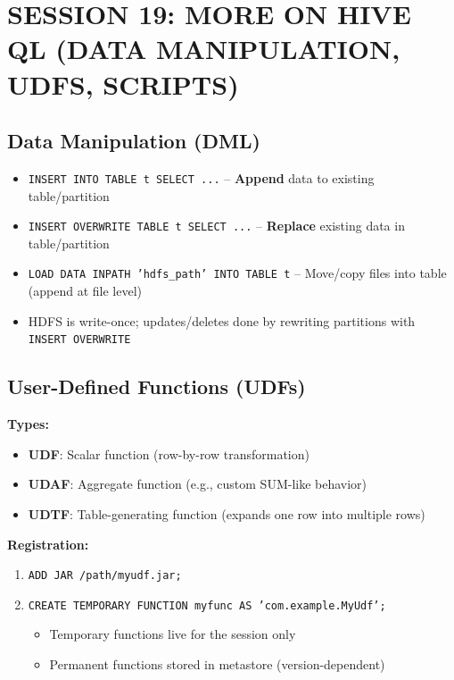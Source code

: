 \documentclass[11pt, onecolumn, a4paper]{article}
\begin{document}
\newpage
\section{SESSION 19: MORE ON HIVE QL (DATA MANIPULATION, UDFS, SCRIPTS)}

\subsection{Data Manipulation (DML)}

\begin{itemize}
  \item \texttt{INSERT INTO TABLE t SELECT ...} -- \textbf{Append} data to existing table/partition
  \item \texttt{INSERT OVERWRITE TABLE t SELECT ...} -- \textbf{Replace} existing data in table/partition
  \item \texttt{LOAD DATA INPATH 'hdfs\_path' INTO TABLE t} -- Move/copy files into table (append at file level)
  \item HDFS is write-once; updates/deletes done by rewriting partitions with \texttt{INSERT OVERWRITE}
\end{itemize}

\subsection{User-Defined Functions (UDFs)}

\textbf{Types:}
\begin{itemize}
  \item \textbf{UDF}: Scalar function (row-by-row transformation)
  \item \textbf{UDAF}: Aggregate function (e.g., custom SUM-like behavior)
  \item \textbf{UDTF}: Table-generating function (expands one row into multiple rows)
\end{itemize}

\textbf{Registration:}
\begin{enumerate}
  \item \texttt{ADD JAR /path/myudf.jar;}
  \item \texttt{CREATE TEMPORARY FUNCTION myfunc AS 'com.example.MyUdf';}
  \begin{itemize}
    \item Temporary functions live for the session only
    \item Permanent functions stored in metastore (version-dependent)
  \end{itemize}
\end{enumerate}
\end{document}
